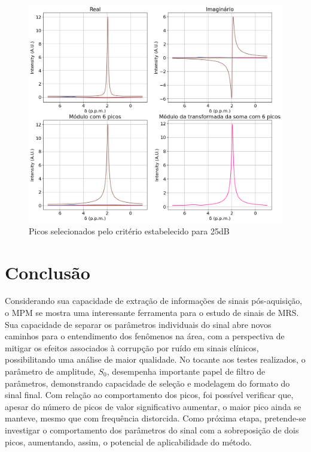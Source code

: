 \documentclass[12pt]{article}
\begin{document}
\begin{figure} [H]
    \centering
    \includegraphics[scale=0.5]{real-imag-modulo-25.png}
    \caption{Picos selecionados pelo critério estabelecido para 25dB}
    \label{fig:16}
\end{figure}
 
\section{Conclusão}

Considerando sua capacidade de extração de informações de sinais pós-aquisição, o MPM se mostra uma interessante ferramenta para o estudo de sinais de MRS. 
Sua capacidade de separar os parâmetros individuais do sinal abre novos caminhos para o entendimento dos fenômenos na área, com a perspectiva de mitigar os 
efeitos associados à corrupção por ruído em sinais clínicos, possibilitando uma análise de maior qualidade. No tocante aos testes realizados, o parâmetro de 
amplitude, $S_0$, desempenha importante papel de filtro de parâmetros, demonstrando capacidade de seleção e modelagem do formato do sinal final. 
Com relação ao comportamento dos picos, foi possível verificar que, apesar do número de picos de valor significativo aumentar, o maior pico ainda se manteve, 
mesmo que com frequência distorcida. Como próxima etapa, pretende-se investigar o comportamento dos parâmetros do sinal com a sobreposição de dois picos, aumentando, 
assim, o potencial de aplicabilidade do método.





\end{document}
